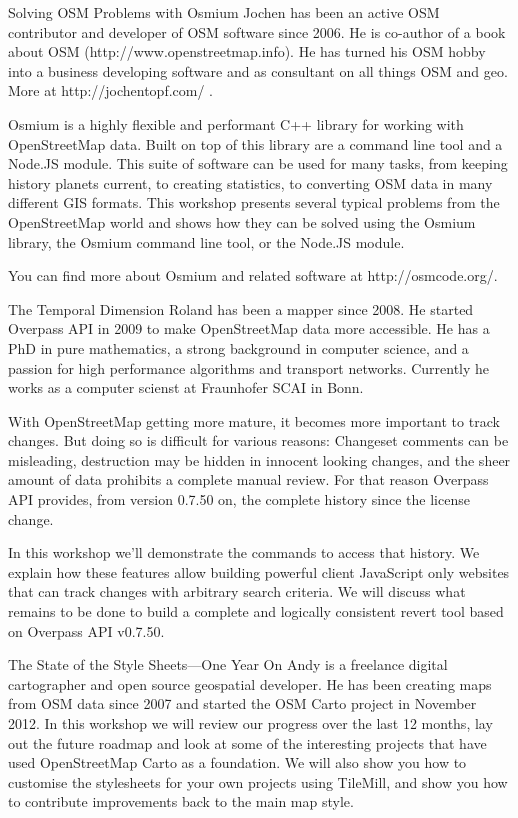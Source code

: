 %
{Solving OSM Problems with Osmium}%
{Jochen has been an active OSM contributor and developer of OSM software since 2006. He is co-author of a book about OSM (http://www.openstreetmap.info). He has turned his OSM hobby into a business developing software and as consultant on all things OSM and geo. More at http://jochentopf.com/ . }%
{Osmium is a highly flexible and performant C++ library for working with OpenStreetMap data. Built on top of this library are a command line tool and a Node.JS module. This suite of software can be used for many tasks, from keeping history planets current, to creating statistics, to converting OSM data in many different GIS formats. This workshop presents several typical problems from the OpenStreetMap world and shows how they can be solved using the Osmium library, the Osmium command line tool, or the Node.JS module. 

You can find more about Osmium and related software at http://osmcode.org/. }

%
{The Temporal Dimension}%
{Roland has been a mapper since 2008. He started Overpass API in 2009 to make OpenStreetMap data more accessible. He has a PhD in pure mathematics, a strong background in computer science, and a passion for high performance algorithms and transport networks. Current\-ly he works as a computer scienst at Fraunhofer SCAI in Bonn. }%
{With OpenStreetMap getting more mature, it becomes more important to track changes. But doing so is difficult for various reasons: Changeset comments can be misleading, destruction may be hidden in innocent looking changes, and the sheer amount of data prohibits a complete manual review. For that reason Overpass API provides, from version 0.7.50 on, the complete history since the license change. 

In this workshop we'll demonstrate the commands to access that history. We explain how these features allow building powerful client JavaScript only websites that can track changes with arbitrary search criteria. We will discuss what remains to be done to build a complete and logically consistent revert tool based on Overpass API v0.7.50. }


%
{The State of the Style Sheets---One Year On}%
{Andy is a freelance digital cartographer and open sour\-ce geospatial developer. He has been creating maps from OSM data since 2007 and started the OSM Carto project in November 2012. }%
{ In this workshop we will review our progress over the
last 12 months, lay out the future roadmap and look at
some of the interesting projects that have used OpenStreetMap Carto as a foundation. We will also show you how to
customise the stylesheets for your own projects using TileMill, and
show you how to contribute improvements back to the main map style.  }

